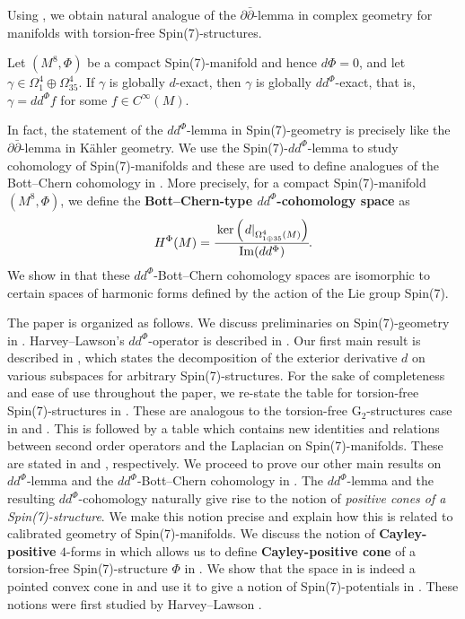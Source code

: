 \documentclass[10pt,a4paper,reqno]{article}
\theoremstyle{definition}
\numberwithin{equation}{section}
\def\pt{\partial}
\def\G2{\mathrm{G}_2}
\def\ddphi{dd^{\Phi}}
\DeclareMathOperator{\Ima}{Im}
\begin{document}
Using , we obtain natural analogue of the $\partial\bar\partial$-lemma in complex geometry for manifolds with torsion-free Spin(7)-structures. 

\medskip

\noindent
\textbf{} Let $(M^8, \Phi)$ be a compact Spin(7)-manifold and hence $d\Phi=0$, and let $\gamma \in \Omega^4_1\oplus \Omega^4_{35}$. If $\gamma$ is globally $d$-exact, then $\gamma$ is globally $\ddphi$-exact, that is, $\gamma=\ddphi f$ for some $f\in C^{\infty}(M)$.

\medskip

In fact, the statement of the $\ddphi$-lemma in Spin(7)-geometry is precisely like the $\pt\bar{\pt}$-lemma in K\"ahler geometry. We use the Spin(7)-$\ddphi$-lemma to study cohomology of Spin(7)-manifolds and these are used to define analogues of the Bott--Chern cohomology in . More precisely, for a compact Spin(7)-manifold $(M^8, \Phi)$, we define the \textbf{Bott--Chern-type $\ddphi$-cohomology space} as
\begin{align}\label{eq:bot-cherncohintro}
H^{\Phi}(M) = \cfrac{\ker \left(\left.d\right|_{\Omega^4_{1\oplus 35}(M)}\right)}{\Ima(\ddphi)}.
\end{align}
We show in  that these $\ddphi$-Bott--Chern cohomology spaces are isomorphic to certain spaces of harmonic forms defined by the action of the Lie group Spin(7). 

\medskip

The paper is organized as follows. We discuss preliminaries on Spin(7)-geometry in . Harvey--Lawson's $\ddphi$-operator is described in . Our first main result is described in ,  which states the decomposition of the exterior derivative $d$ on various subspaces for arbitrary Spin(7)-structures. For the sake of completeness and ease of use throughout the paper, we re-state the table for torsion-free Spin(7)-structures in . These are analogous to the torsion-free $\G2$-structures case in \cite[Table 1]{bryant-someremarks} and \cite[Figure 1]{chan-karigiannis-tsang}. This is followed by a table which contains new identities and relations between second order operators and the Laplacian on Spin(7)-manifolds. These are stated in  and , respectively. We proceed to prove our other main results on $\ddphi$-lemma and the $\ddphi$-Bott--Chern cohomology in . The $\ddphi$-lemma and the resulting $\ddphi$-cohomology naturally give rise to the notion of \emph{positive cones of a Spin(7)-structure}. We make this notion precise and explain how this is related to calibrated geometry of Spin(7)-manifolds. We discuss the notion of \textbf{Cayley-positive} $4$-forms in  which allows us to define \textbf{Cayley-positive cone} of a torsion-free Spin(7)-structure $\Phi$ in . We show that the space in  is indeed a pointed convex cone in  and use it to give a notion of Spin(7)-potentials in . These notions were first studied by Harvey--Lawson \cite{HL-intropotential, HL-positive}.
\end{document}
